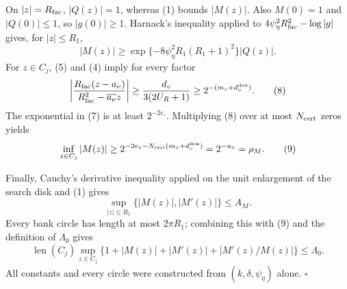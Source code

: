 On \(|z|=R_{\rm fac}\), \(|Q(z)|=1\), whereas (1) bounds \(|M(z)|\). Also \(M(0)=1\) and \(|Q(0)|\le1\), so \(|g(0)|\ge1\). Harnack's inequality applied to \(4\psi_\eta^2R_{\rm fac}^2-\log|g|\) gives, for \(|z|\le R_1\),
\[
 |M(z)|\ge
 \exp\{-8\psi_\eta^2R_1(R_1+1)^2\}|Q(z)|. \tag{7}
\]
For \(z\in C_j\), (5) and (4) imply for every factor
\[
 \left|
 \frac{R_{\rm fac}(z-a_\nu)}
 {R_{\rm fac}^2-\overline{a_\nu}z}
 \right|
 \ge\frac{d_\circ}{3(2U_R+1)}
 \ge2^{-(m_\circ+d_\circ^{\rm den})}. \tag{8}
\]
The exponential in (7) is at least \(2^{-2e_\circ}\). Multiplying (8) over at most \(N_{\rm cert}\) zeros yields
\[
 \inf_{z\in C_j}|M(z)|
 \ge2^{-2e_\circ-N_{\rm cert}(m_\circ+d_\circ^{\rm den})}
 =2^{-u_\circ}=\rho_M. \tag{9}
\]

Finally, Cauchy's derivative inequality applied on the unit enlargement of the search disk and (1) gives
\[
 \sup_{|z|\le R_1}\{|M(z)|,|M'(z)|\}\le A_M.
\]
Every bank circle has length at most \(2\pi R_1\); combining this with (9) and the definition of \(\Lambda_0\) gives
\[
 \operatorname{len}(C_j)\sup_{z\in C_j}
 \{1+|M(z)|+|M'(z)|+|M'(z)/M(z)|\}\le\Lambda_0.
\]
All constants and every circle were constructed from \((k,\delta,\psi_\eta)\) alone. \(\square\)